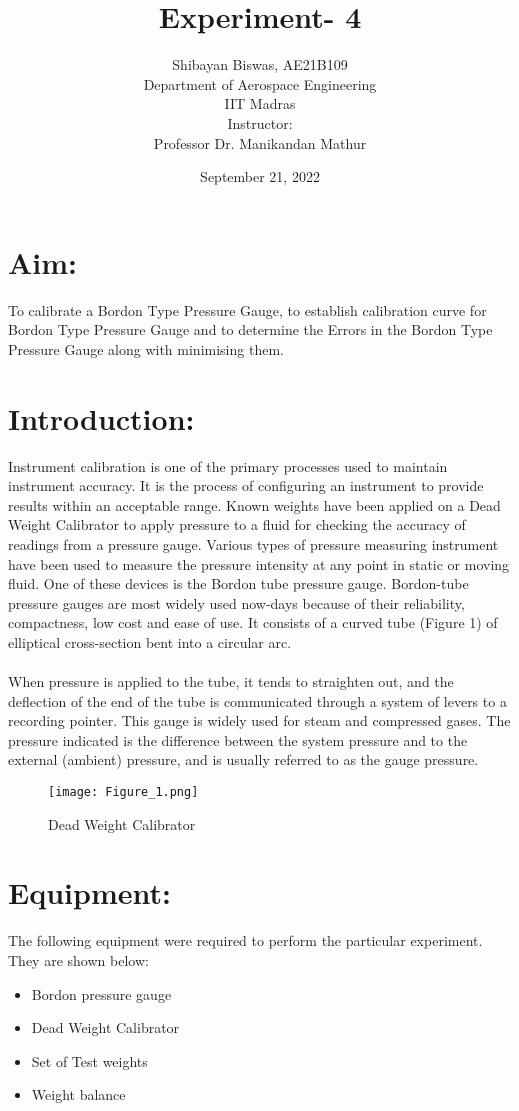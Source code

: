 \documentclass[12pt,a4paper]{article}
\author{ Shibayan Biswas, AE21B109\\ Department of Aerospace Engineering\\ IIT Madras\\[3ex] Instructor:\\ \large Professor Dr. Manikandan Mathur}
\title{Experiment- 4}
\date{September 21, 2022}
\begin{document}
\maketitle
\hline
\section{Aim:}
To calibrate a Bordon Type Pressure Gauge, to establish calibration curve for Bordon Type Pressure Gauge and to determine the Errors in the Bordon Type Pressure Gauge along with minimising them.
\section{Introduction:}
Instrument calibration is one of the primary processes used to maintain instrument accuracy. It is the process of configuring an instrument to provide results within an acceptable range. Known weights have been applied on a Dead Weight Calibrator to apply pressure to a fluid for checking the accuracy of readings from a pressure gauge. Various types of pressure measuring instrument have been used to measure the pressure intensity at any point in static or moving fluid. One of these devices is the
Bordon tube pressure gauge. Bordon-tube pressure gauges are most widely used now-days because of their reliability, compactness, low cost and ease of use. It consists of a curved tube (Figure 1) of elliptical cross-section bent into a circular arc. \\
\\When pressure is applied to the tube, it tends to straighten out, and the deflection of the end of the tube is communicated through a system of levers to a recording pointer. This gauge is widely used for steam and compressed gases. The pressure indicated is the difference between the system pressure and to the external (ambient) pressure, and is usually referred to as the gauge pressure. 
\clearpage
\begin{figure}[!ht]
	\begin{center}
			\texttt{[image: Figure\_1.png]}
	\end{center}
	\caption{Dead Weight Calibrator}
\end{figure}
\section{Equipment:}
The following equipment were required to perform the particular experiment. They are shown below:
\begin{itemize}
\item Bordon pressure gauge
\item Dead Weight Calibrator
\item Set of Test weights
\item Weight balance
\end{itemize}
\end{document}
